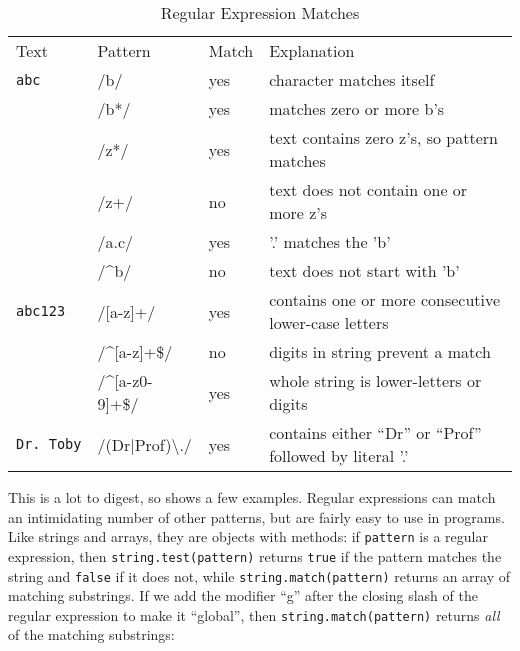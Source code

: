 \begin{table}
\begin{longtable}{llll}
Text
& Pattern
& Match
& Explanation
\\

\texttt{abc}
& /b/
& yes
&
character matches itself
\\

& /b*/
& yes
& matches zero or more b's
\\

& /z*/
& yes
& text contains zero z's, so pattern matches
\\

& /z+/
& no
& text does not contain one or more z's
\\

& /a.c/
& yes
& '.' matches the 'b'
\\

& /{\textasciicircum}b/
& no
& text does not start with 'b'
\\

\texttt{abc123}
& /[a-z]+/
& yes
& contains one or more consecutive lower-case letters
\\

& /{\textasciicircum}[a-z]+\$/
& no
& digits in string prevent a match
\\

& /{\textasciicircum}[a-z0-9]+\$/
& yes
& whole string is lower-letters or digits
\\

\texttt{Dr.\ Toby}
& /(Dr|Prof){\textbackslash}./
& yes & contains either ``Dr'' or ``Prof'' followed by literal '.'
\\

\end{longtable}
\caption{Regular Expression Matches}
\label{t:regexp-examples}
\end{table}

This is a lot to digest,
so  shows a few examples.
Regular expressions can match an intimidating number of other patterns,
but are fairly easy to use in programs.
Like strings and arrays,
they are objects with methods:
if \texttt{pattern} is a regular expression,
then \texttt{string.test(pattern)} returns \texttt{true} if the pattern matches the string
and \texttt{false} if it does not,
while \texttt{string.match(pattern)} returns an array of matching substrings.
If we add the modifier ``g'' after the closing slash of the regular expression to make it ``global'',
then \texttt{string.match(pattern)} returns \emph{all} of the matching substrings:

